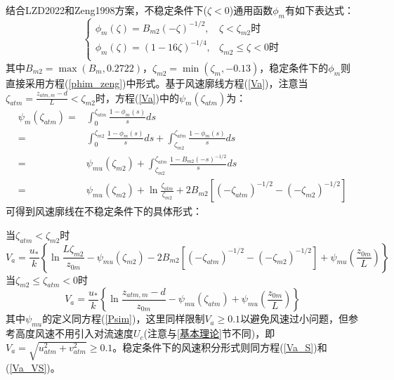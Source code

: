 结合LZD2022和Zeng1998方案，不稳定条件下($\zeta<0$)通用函数$\phi_{m}$有如下表达式：
\begin{equation}
\left\{\begin{array}{lr}\phi_{m}(\zeta)=B_{m2}(-\zeta)^{-1/2}, & \zeta<\zeta_{m2} \text {时} \\
      \phi_{m}(\zeta)=(1-16 \zeta)^{-1/4}, & \zeta_{m2} \leq \zeta<0 \text {时} \\
       \end{array}\right.
\end{equation}
其中$B_{m2}=\max(B_{m},0.2722)$，$\zeta_{m2}=\min(\zeta_{m},-0.13)$，稳定条件下的$\phi_{m}$则直接采用方程(\ref{phim_zeng})中形式。基于风速廓线方程(\ref{Va})，注意当
$\zeta_{atm}=\frac{z_{atm,m}-d}{L}<\zeta_{m2}$时，方程(\ref{Va})中的$\psi_{m}\left(\zeta_{atm}\right)$为：
\begin{align}
\psi_{m}\left(\zeta_{atm}\right) =& \int_{0}^{\zeta_{atm}} \frac{1-\phi_{m}(s)}{s} d s  \nonumber \\
 =& \int_{0}^{\zeta_{m2}} \frac{1-\phi_{m}(s)}{s} d s + \int_{\zeta_{m2}}^{\zeta_{atm}} \frac{1-\phi_{m}(s)}{s} d s  \nonumber \\
 =& \psi_{mu}(\zeta_{m2}) + \int_{\zeta_{m2}}^{\zeta_{atm}} \frac{1-B_{m2}(-s)^{-1/2}}{s} d s  \nonumber \\
 =& \psi_{mu}(\zeta_{m2}) + \ln \frac{\zeta_{atm}}{\zeta_{m2}} + 2B_{m2}\left[(-\zeta_{atm})^{-1/2}-(-\zeta_{m2})^{-1/2}\right]
\end{align}
可得到风速廓线在不稳定条件下的具体形式：

\noindent 当$\zeta_{atm}<\zeta_{m2}$时
\begin{equation}\label{Va_U_LZD1}
V_{a}=\frac{u_{*}}{k}\left\{\ln \frac{L\zeta_{m2}}{z_{0 m}}-\psi_{mu}\left(\zeta_{m2}\right)-2B_{m2}\left[(-\zeta_{atm})^{-1/2}-(-\zeta_{m2})^{-1/2}\right]+\psi_{mu}\left(\frac{z_{0 m}}{L}\right)\right\}
\end{equation}
\noindent 当$ \zeta_{m2} \leq \zeta_{atm}<0$时
\begin{equation}\label{Va_U_LZD2}
V_{a}=\frac{u_{*}}{k}\left\{\ln \frac{z_{atm, m}-d}{z_{0 m}}-\psi_{mu}\left(\zeta_{atm}\right)+\psi_{mu}\left(\frac{z_{0 m}}{L}\right)\right\}
\end{equation}
其中$\psi_{mu}$的定义同方程(\ref{Psim})，这里同样限制$V_a\geq0.1$以避免风速过小问题，但参考高度风速不用引入对流速度$U_c$(注意与\ref{基本理论}节不同)，即
$V_{a}=\sqrt{u_{atm}^{2}+v_{atm}^{2}} \geq 0.1$。稳定条件下的风速积分形式则同方程(\ref{Va_S})和(\ref{Va_VS})。

